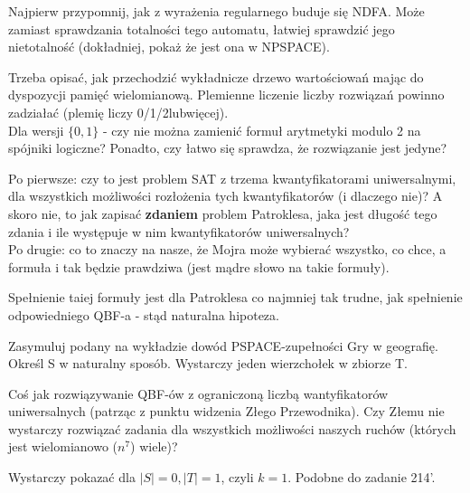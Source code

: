 \documentclass[a4paper,11pt]{article}
\newenvironment{zadanie}[1]
  {\renewcommand\theinnercustomthm{#1}\innercustomthm}
  {\endinnercustomthm}
\begin{document}
\begin{zadanie}{194}
 Najpierw przypomnij, jak z wyrażenia regularnego buduje się NDFA. Może zamiast sprawdzania totalności tego automatu, łatwiej
 sprawdzić jego nietotalność (dokładniej, pokaż że jest ona w NPSPACE).
\end{zadanie}

\begin{zadanie}{195}
 Trzeba opisać, jak przechodzić wykładnicze drzewo wartościowań mając do dyspozycji pamięć wielomianową. Plemienne liczenie
 liczby rozwiązań powinno zadziałać (plemię liczy 0/1/2lubwięcej). \\
 Dla wersji $\{0,1\}$ - czy nie można zamienić formuł arytmetyki modulo 2 na spójniki logiczne? Ponadto, czy łatwo się sprawdza,
 że rozwiązanie jest jedyne?
\end{zadanie}

\begin{zadanie}{196}
 Po pierwsze: czy to jest problem SAT z trzema kwantyfikatorami uniwersalnymi, dla wszystkich możliwości rozłożenia tych
 kwantyfikatorów (i dlaczego nie)? A skoro nie, to jak zapisać \textbf{zdaniem} problem Patroklesa, jaka jest długość tego
 zdania i ile występuje w nim kwantyfikatorów uniwersalnych? \\
 Po drugie: co to znaczy na nasze, że Mojra może wybierać wszystko, co chce, a formuła i tak będzie prawdziwa (jest mądre słowo
 na takie formuły).
\end{zadanie}

\begin{zadanie}{197}
 Spełnienie taiej formuły jest dla Patroklesa co najmniej tak trudne, jak spełnienie odpowiedniego QBF-a - stąd naturalna 
 hipoteza.
\end{zadanie}

\begin{zadanie}{212}
 Zasymuluj podany na wykładzie dowód PSPACE-zupełności Gry w geografię. Określ S w naturalny sposób. Wystarczy jeden wierzchołek
 w zbiorze T.
\end{zadanie}

\begin{zadanie}{213}
 Coś jak rozwiązywanie QBF-ów z ograniczoną liczbą wantyfikatorów uniwersalnych (patrząc z punktu widzenia Złego Przewodnika).
 Czy Złemu nie wystarczy rozwiązać zadania dla wszystkich możliwości naszych ruchów (których jest wielomianowo ($n^7$) wiele)?
\end{zadanie}

\begin{zadanie}{214}
 Wystarczy pokazać dla $|S| = 0, |T| = 1$, czyli $k=1$. Podobne do zadanie 214'.
\end{zadanie}
\end{document}
